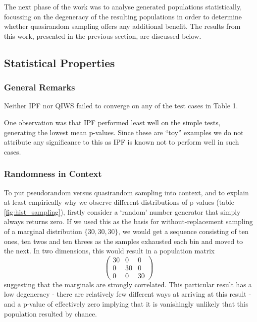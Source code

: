 \documentclass{JASSS}
\begin{document}
The next phase of the work was to analyse generated populations
statistically, focussing on the degeneracy of the resulting populations in order to determine whether quasirandom sampling offers any additional benefit.
The results from this work, presented in the previous section, are
discussed below.

\subsection{Statistical Properties}\label{statistical-properties-1}

\subsubsection{General Remarks}\label{general-remarks}

Neither IPF nor QIWS failed to converge on any of the test cases in
Table 1.

One observation was that IPF performed least well on the
simple tests, generating the lowest mean p-values. Since these are
``toy'' examples we do not attribute any significance to this as IPF is known not to perform well in such cases.

\subsubsection{Randomness in Context}\label{randomness-in-context}

To put pseudorandom versus quasirandom sampling into context, and to explain at least empirically 
why we observe different distributions of p-values (table \ref{fig:hist_sampling}), firstly consider a
`random' number generator that simply always returns zero. If we used
this as the basis for without-replacement sampling of a marginal
distribution \(\lbrace30,30,30\rbrace\), we would get a sequence
consisting of ten ones, ten twos and ten threes as the samples exhausted
each bin and moved to the next. In two dimensions, this would result in
a population matrix
\[\left( \begin{array}{ccc}
30 & 0 & 0 \\
0 & 30 & 0 \\
0 & 0 & 30 \end{array} \right)\]
suggesting that the marginals are strongly correlated. This particular
result has a low degeneracy - there are relatively few different ways at
arriving at this result - and a p-value of effectively zero implying
that it is vanishingly unlikely that this population resulted by chance.
\end{document}
